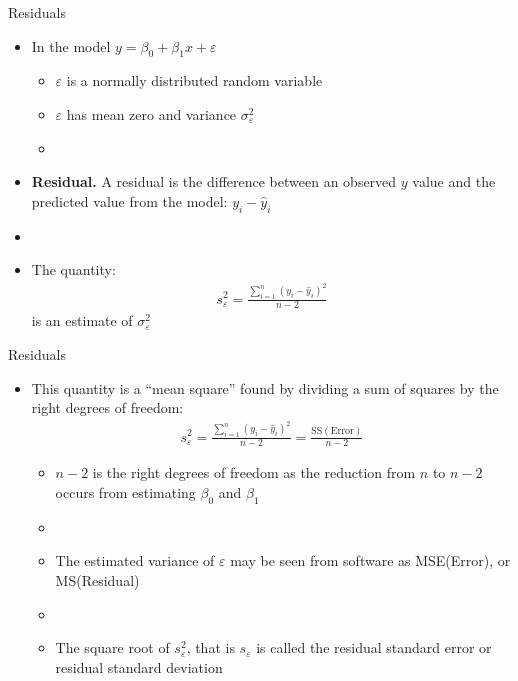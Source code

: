 \documentclass[xcolor=dvipsnames]{beamer}
\begin{document}
\begin{frame}{Residuals}
\begin{itemize}
	\item In the model $y = \beta_0 + \beta_1 x + \varepsilon$
	\begin{itemize}
		\item $\varepsilon$ is a normally distributed random variable
		\item $\varepsilon$ has mean zero and variance $\sigma^2_{\varepsilon}$
		\item[]
	\end{itemize} 
	\item \textbf{Residual.} A residual is the difference between an observed $y$ value and the predicted value from the model: $y_i - \hat{y}_i$
	\item[]
	\item The quantity: 
	\begin{gather*}
		s^2_{\varepsilon} = \frac{\sum_{i=1}^{n}\left(y_i - \hat{y}_i\right)^2}{n-2}
	\end{gather*}
	is an estimate of $\sigma^2_{\varepsilon}$
\end{itemize}
\end{frame}

\begin{frame}{Residuals}
	\begin{itemize}
		\item This quantity is a ``mean square'' found by dividing a sum of squares by the right degrees of freedom:
		\begin{gather*}
		s^2_{\varepsilon} = \frac{\sum_{i=1}^{n}\left(y_i - \hat{y}_i\right)^2}{n-2} = \frac{\text{SS}(\text{Error})}{n-2}
		\end{gather*}
		\begin{itemize}
			\item $n-2$ is the right degrees of freedom as the reduction from $n$ to $n-2$ occurs from estimating $\beta_0$ and $\beta_1$
			\item[]
			\item The estimated variance of $\varepsilon$ may be seen from software as MSE(Error), or MS(Residual)
			\item[]
			\item The square root of $s_{\varepsilon}^2$, that is $s_{\varepsilon}$ is called the residual standard error or residual standard deviation
		\end{itemize}
	\end{itemize}
\end{frame}
\end{document}
